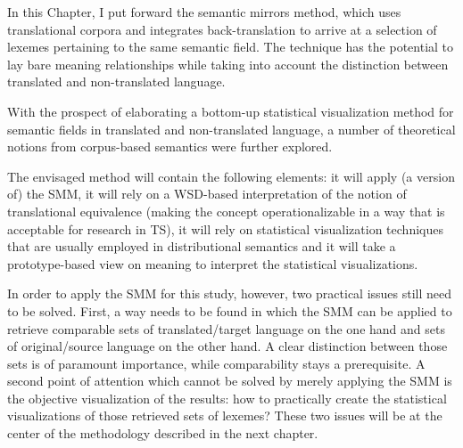 In this Chapter, I put forward the semantic mirrors method, which uses translational corpora and integrates back-translation to arrive at a selection of lexemes pertaining to the same semantic field. The technique has the potential to lay bare meaning relationships while taking into account the distinction between translated and non-translated language.



With the prospect of elaborating a bottom-up statistical visualization method for semantic fields in translated and non-translated language, a number of theoretical notions from corpus-based semantics were further explored.



The envisaged method will contain the following elements: it will apply (a version of) the SMM, it will rely on a WSD-based interpretation of the notion of translational equivalence (making the concept operationalizable in a way that is acceptable for research in TS), it will rely on statistical visualization techniques that are usually employed in distributional semantics and it will take a prototype-based view on meaning to interpret the statistical visualizations.



In order to apply the SMM for this study, however, two practical issues still need to be solved. First, a way needs to be found in which the SMM can be applied to retrieve comparable sets of translated/target language on the one hand and sets of original/source language on the other hand. A clear distinction between those sets is of paramount importance, while comparability stays a prerequisite. A second point of attention which cannot be solved by merely applying the SMM is the objective visualization of the results: how to practically create the statistical visualizations of those retrieved sets of lexemes? These two issues will be at the center of the methodology described in the next chapter.


